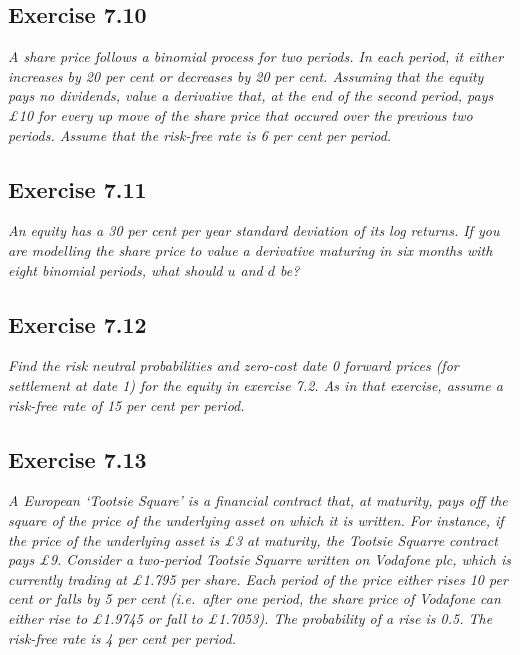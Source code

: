 \documentclass[]{book}
\theoremstyle{definition}
\theoremstyle{definition}
\theoremstyle{remark}
\begin{document}
\subsection{Exercise 7.10}\label{exercise-7.10}

\emph{A share price follows a binomial process for two periods. In each
period, it either increases by 20 per cent or decreases by 20 per cent.
Assuming that the equity pays no dividends, value a derivative that, at
the end of the second period, pays £10 for every up move of the share
price that occured over the previous two periods. Assume that the
risk-free rate is 6 per cent per period.} \citep[p.236]{book}

\subsection{Exercise 7.11}\label{exercise-7.11}

\emph{An equity has a 30 per cent per year standard deviation of its log
returns. If you are modelling the share price to value a derivative
maturing in six months with eight binomial periods, what should \(u\)
and \(d\) be?} \citep[p.236]{book}

\subsection{Exercise 7.12}\label{exercise-7.12}

\emph{Find the risk neutral probabilities and zero-cost date 0 forward
prices (for settlement at date 1) for the equity in exercise 7.2. As in
that exercise, assume a risk-free rate of 15 per cent per period.}
\citep[p.236]{book}

\subsection{Exercise 7.13}\label{exercise-7.13}

\emph{A European `Tootsie Square' is a financial contract that, at
maturity, pays off the square of the price of the underlying asset on
which it is written. For instance, if the price of the underlying asset
is £3 at maturity, the Tootsie Squarre contract pays £9. Consider a
two-period Tootsie Squarre written on Vodafone plc, which is currently
trading at £1.795 per share. Each period of the price either rises 10
per cent or falls by 5 per cent (i.e.~after one period, the share price
of Vodafone can either rise to £1.9745 or fall to £1.7053). The
probability of a rise is 0.5. The risk-free rate is 4 per cent per
period.} \citep[p.236]{book}
\end{document}
